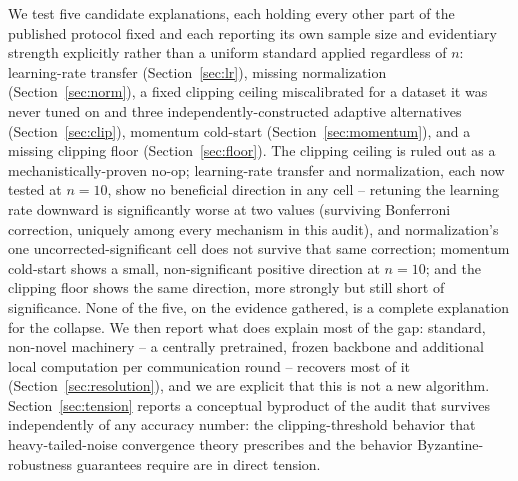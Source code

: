 \documentclass{article}
\begin{document}
We test five candidate explanations, each holding every other part of the
published protocol fixed and each reporting its own sample size and evidentiary
strength explicitly rather than a uniform standard applied regardless of $n$:
learning-rate transfer (Section~\ref{sec:lr}), missing normalization
(Section~\ref{sec:norm}), a fixed clipping ceiling miscalibrated for a dataset
it was never tuned on and three independently-constructed adaptive alternatives
(Section~\ref{sec:clip}), momentum cold-start
(Section~\ref{sec:momentum}), and a missing clipping floor
(Section~\ref{sec:floor}). The clipping ceiling is ruled out as a
mechanistically-proven no-op; learning-rate transfer and normalization, each
now tested at $n{=}10$, show no beneficial direction in any cell -- retuning
the learning rate downward is significantly worse at two values (surviving
Bonferroni correction, uniquely among every mechanism in this audit), and
normalization's one uncorrected-significant cell does not survive that same
correction; momentum cold-start shows a small, non-significant positive
direction at $n{=}10$; and the clipping floor shows the same direction, more
strongly but still short of significance. None of the five, on the evidence
gathered, is a complete explanation for the collapse. We then
report what does explain most of the gap: standard, non-novel machinery -- a
centrally pretrained, frozen backbone and additional local computation per
communication round -- recovers most of it (Section~\ref{sec:resolution}), and
we are explicit that this is not a new algorithm. Section~\ref{sec:tension}
reports a conceptual byproduct of the audit that survives independently of any
accuracy number: the clipping-threshold behavior that heavy-tailed-noise
convergence theory prescribes and the behavior Byzantine-robustness guarantees
require are in direct tension.
\end{document}
